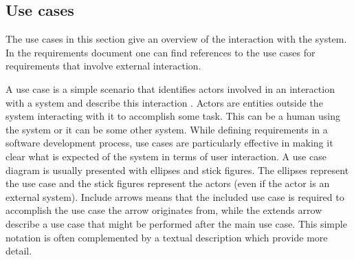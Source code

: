 \subsection{Use cases}
\label{subsec:use_cases}

The use cases in this section give an overview of the interaction with the system. In the requirements document one can find references to the use cases for requirements that involve external interaction.\newline

A use case is a simple scenario that identifies actors involved in an interaction with a system and describe this interaction \cite[p.106-107]{Sommerville}. Actors are entities outside the system interacting with it to accomplish some task. This can be a human using the system or it can be some other system. While defining requirements in a software development process, use cases are particularly effective in making it clear what is expected of the system in terms of user interaction. A use case diagram is usually presented with ellipses and stick figures. The ellipses represent the use case and the stick figures represent the actors (even if the actor is an external system). Include arrows means that the included use case is required to accomplish the use case the arrow originates from, while the extends arrow describe a use case that might be performed after the main use case. This simple notation is often complemented by a textual description which provide more detail.\newline

